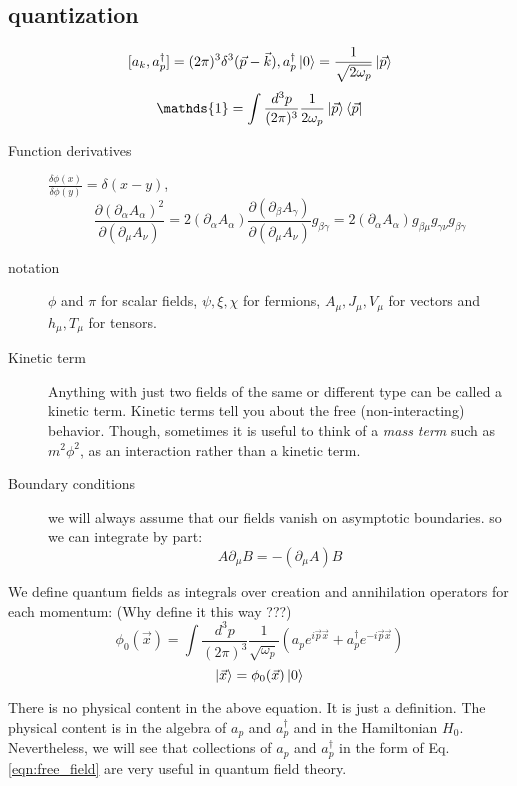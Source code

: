 \subsection{quantization}
\[ [a_k, a_p^{\dag}] = (2\pi)^{3}\delta^{3}(\vec{p}-\vec{k}), 
a_p^{\dag}\ket{0} = \frac{1}{\sqrt{2\omega_p}}\ket{\vec{p}} \]
\[
    \mathds{1}=\int\frac{d^3p}{(2\pi)^3}\frac{1}{2\omega_p}\ket{\vec{p}}\bra{\vec{p}}
    \]

\begin{description}
    \item [Function derivatives]
	$\frac{\delta \phi(x)}{\delta \phi(y)} = \delta(x-y)$, 
	\[ 
	\frac{\partial(\partial_\alpha A_\alpha)^2}{\partial(\partial_{\mu}A_\nu)}
	=2(\partial_{\alpha}A_\alpha)\frac{\partial(\partial_{\beta}A_\gamma)}{\partial(\partial_{\mu}A_\nu)}g_{\beta\gamma}
	=2(\partial_{\alpha}A_\alpha)g_{\beta\mu}g_{\gamma\nu}g_{\beta\gamma}
	\]
    \item [notation] $\phi$ and $\pi$ for scalar fields, $\psi, \xi,
	\chi$ for fermions, $A_{\mu}, J_{\mu}, V_{\mu}$ for vectors and
	$h_{\mu},T_{\mu}$ for tensors.
    \item [Kinetic term] Anything with just two fields of the same or
	different type can be called a kinetic term. Kinetic terms tell you
	about the free (non-interacting) behavior. Though, sometimes it is useful to
	think of a \emph{mass term} such as $m^2\phi^2$, as an interaction
	rather than a kinetic term.
    \item [Boundary conditions] we will always assume that our fields vanish
	on asymptotic boundaries. so we can integrate by part:
	\emph{\[ A\partial_\mu B = -(\partial_\mu A) B\]}
\end{description}

We define quantum fields as integrals over creation and annihilation
operators for each momentum: (Why define it this way ???)
\begin{equation}
\phi_0(\vec{x}) = \int \frac{d^{3}p}{(2\pi)^3}
\frac{1}{\sqrt{\omega_p}}(a_pe^{i\vec{p}\vec{x}} + a_p^\dag
e^{-i\vec{p}\vec{x}})
    \label{eqn:free_field}
\end{equation}
\[ \ket{\vec{x}} = \phi_0(\vec{x}) \ket{0} \]

There is no physical content in the above equation. It is just a definition.
The physical content is in the algebra of $a_p$ and $a_p^{\dag}$ and in the
Hamiltonian $H_0$. Nevertheless, we will see that collections of $a_p$ and
$a_p^{\dag}$ in the form of Eq.\ref{eqn:free_field} are very useful in
quantum field theory.

